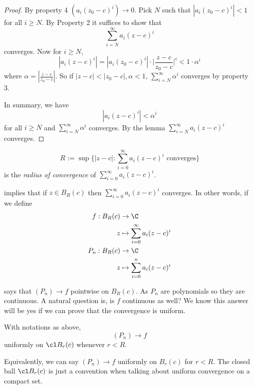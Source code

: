 \documentclass[a4paper]{article}
\theoremstyle{definition}
\begin{document}
\begin{proof}
  By property 4 \((a_i(z_0-c)^i)\to 0\). Pick \(N\) such that \(|a_i(z_0-c)^i|<1\) for all \(i\geq N\). By Property 2 it suffices to show that
  \[
    \sum_{i=N}^{\infty}a_i(z-c)^i
  \]
  converges. Now for \(i\geq N\),
  \[
    \label{eqn:fundamental est}
    \boxed{
    |a_i(z-c)^i| = |a_i(z_0-c)^i| \cdot \Big| \frac{z-c}{z_0-c} \Big|^i < 1\cdot \alpha^i
    }
    \tag*{Fundamental Estimate for Power Series}
    \]
  where \(\alpha = |\frac{z-c}{z_0-c}|\). So if \(|z-c| < |z_0-c|,\alpha<1\), \(\sum_{i=N}^{\infty}\alpha^i \) converges by property 3.

  In summary, we have
  \[
|a_i(z-c)^i| < \alpha^i
\]
for all \(i\geq N\) and \(\sum_{i=N}^{\infty}\alpha^i \) converges. By the lemma \(\sum_{i=N}^{\infty}a_i(z-c)^i \) converges.
\end{proof}

\begin{definition}
  \[
    R := \sup \{ |z-c|: \sum_{i=0}^{\infty}a_i (z-c)^i \text{ converges}\}
  \]
  is the \emph{radius of convergence} of \(\sum_{i=0}^{\infty}a_i(z-c)^i \).
\end{definition}

 implies that if \(z\in B_R(c)\) then \(\sum_{i=0}^{\infty}a_i(z-c)^i \) converges. In other words, if we define
\begin{align*}
  f: B_R(c) &\to \C \\
  z &\mapsto \sum_{i=0}^{\infty} a_i(z-c)^i \\
  P_n: B_R(c) &\to \C \\
  z &\mapsto \sum_{i=0}^{n} a_i(z-c)^i
\end{align*}

 says that \((P_n)\to f\) pointwise on \(B_R(c)\). As \(P_n\) are polynomials so they are continuous. A natural question is, is \(f\) continuous as well? We know this answer will be yes if we can prove that the convergence is uniform.

\begin{theorem}
  With notations as above,
  \[
(P_n)\to f
\]
uniformly on \(\cl B_r(c)\) whenever \(r<R\).
\end{theorem}

\begin{note}
  Equivalently, we can say \((P_n)\to f\) uniformly on \(B_r(c)\) for \(r<R\). The closed ball \(\cl B_r(c)\) is just a convention when talking about uniform convergence on a compact set.
\end{note}
\end{document}
